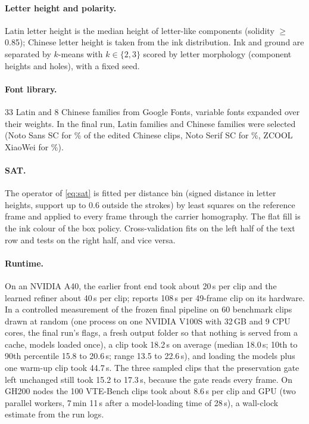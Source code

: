 \paragraph{Letter height and polarity.} Latin letter height is the median height of letter-like components (solidity $\geq$0.85); Chinese letter height is taken from the ink distribution. Ink and ground are separated by $k$-means with $k\in\{2,3\}$ scored by letter morphology (component heights and holes), with a fixed seed.

\paragraph{Font library.} 33 Latin and 8 Chinese families from Google Fonts, variable fonts expanded over their weights. In the final run, \rLatinFam{} Latin families and \rZhFam{} Chinese families were selected (Noto Sans SC for \rNotoPct\% of the edited Chinese clips, Noto Serif SC for \rNotoSerifPct\%, ZCOOL XiaoWei for \rZcoolPct\%).

\paragraph{SAT.} The operator of \cref{eq:sat} is fitted per distance bin (signed distance in letter heights, support up to 0.6 outside the strokes) by least squares on the reference frame and applied to every frame through the carrier homography. The flat fill is the ink colour of the box policy. Cross-validation fits on the left half of the text row and tests on the right half, and vice versa.

\paragraph{Runtime.} On an NVIDIA A40, the earlier front end took about 20\,s per clip and the learned refiner about 40\,s per clip; \steer reports 108\,s per 49-frame clip on its hardware. In a controlled measurement of the frozen final pipeline on 60 benchmark clips drawn at random (one process on one NVIDIA V100S with 32\,GB and 9 CPU cores, the final run's flags, a fresh output folder so that nothing is served from a cache, models loaded once), a clip took 18.2\,s on average (median 18.0\,s; 10th to 90th percentile 15.8 to 20.6\,s; range 13.5 to 22.6\,s), and loading the models plus one warm-up clip took 44.7\,s. The three sampled clips that the preservation gate left unchanged still took 15.2 to 17.3\,s, because the gate reads every frame. On GH200 nodes the 100 VTE-Bench clips took about 8.6\,s per clip and GPU (two parallel workers, 7\,min 11\,s after a model-loading time of 28\,s), a wall-clock estimate from the run logs.

